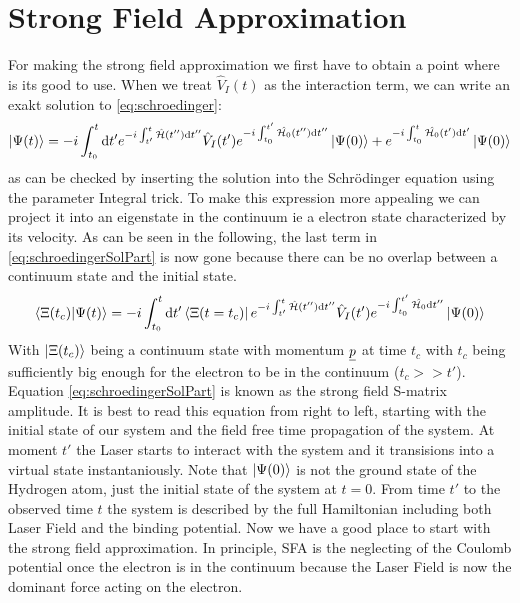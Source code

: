 \newpage
\section{Strong Field Approximation}

For making the strong field approximation we first have to obtain a point where is its good to use. 
When we treat $\hat{V}_I(t)$ as the interaction term, we can write an exakt solution to \eqref{eq:schroedinger}:
\begin{equation}
    \ket{\Psi(t)} = -i \int_{t_0}^{t} \mathrm{d} t' e^{-i \int_{t'}^{t} \hat{\mathcal{H}}(t'') \mathrm{d} t''} \hat{V}_I(t') e^{-i \int_{t_0}^{t'} \hat{\mathcal{H}_0}(t'') \mathrm{d} t''} \ket{\Psi(0)} + e^{-i \int_{t_0}^{t} \hat{\mathcal{H}_0}(t') \mathrm{d} t'} \ket{\Psi(0)} \label{eq:schroedingerSolPart}
\end{equation}
as can be checked by inserting the solution into the Schrödinger equation using the parameter Integral trick. 
To make this expression more appealing we can project it into an eigenstate in the continuum ie a electron state characterized by its velocity.
As can be seen in the following, the last term in \eqref{eq:schroedingerSolPart} is now gone because there can be no overlap between a continuum state and the initial state.
\begin{equation}
    \braket{\Xi(t_c)|\Psi(t)} = -i \int_{t_0}^{t} \mathrm{d} t' \bra{\Xi(t=t_c)} e^{-i \int_{t'}^{t} \hat{\mathcal{H}}(t'') \mathrm{d} t''}\hat{V}_I(t') e^{-i \int_{t_0}^{t'} \hat{\mathcal{H}_0} \mathrm{d} t''} \ket{\Psi(0)}
\end{equation}
With $\ket{\Xi(t_c)}$ being a continuum state with momentum $\underline{p}$ at time $t_c$ with $t_c$ being sufficiently big enough for the electron to be in the continuum ($t_c >> t'$). 
Equation \eqref{eq:schroedingerSolPart} is known as the strong field S-matrix amplitude. 
It is best to read this equation from right to left, starting with the initial state of our system and the field free time propagation of the system. 
At moment $t'$ the Laser starts to interact with the system and it transisions into a virtual state instantaniously. 
Note that $\ket{\Psi(0)}$ is not the ground state of the Hydrogen atom, just the initial state of the system at $t=0$.
From time $t'$ to the observed time $t$ the system is described by the full Hamiltonian including both Laser Field and the binding potential.
Now we have a good place to start with the strong field approximation. 
In principle, SFA is the neglecting of the Coulomb potential once the electron is in the continuum because the Laser Field is now the dominant force acting on the electron.
